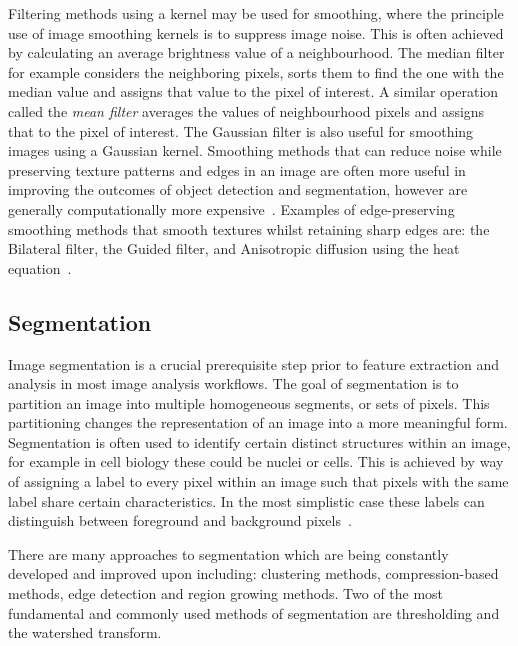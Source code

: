 Filtering methods using a kernel  may be used for smoothing, where the principle use of image smoothing kernels is to suppress image noise. This is often achieved by calculating an average brightness value of a neighbourhood. The median filter for example considers the neighboring pixels, sorts them to find the one with the median value and assigns that value to the pixel of interest. A similar operation called the \emph{mean filter} averages the values of neighbourhood pixels and assigns that to the pixel of interest. The Gaussian filter is also useful for smoothing images using a Gaussian kernel. Smoothing methods that can reduce noise while preserving texture patterns and edges in an image are often more useful in improving the outcomes of object detection and segmentation, however are generally computationally more expensive~\cite{Sonka2007}. Examples of edge-preserving smoothing methods that smooth textures whilst retaining sharp edges are: the Bilateral filter, the Guided filter, and Anisotropic diffusion using the heat equation~\cite{Pal2015}.

\subsection{Segmentation}
\label{introduction:image_processing:segmentation}
Image segmentation is a crucial prerequisite step prior to feature extraction and analysis in most image analysis workflows. The goal of segmentation is to partition an image into multiple homogeneous segments, or sets of pixels. This partitioning changes the representation of an image into a more meaningful form. Segmentation is often used to identify certain distinct structures within an image, for example in cell biology these could be nuclei or cells. This is achieved by way of assigning a label to every pixel within an image such that pixels with the same label share certain characteristics. In the most simplistic case these labels can distinguish between foreground and background pixels~\cite{Russ2006}.

There are many approaches to segmentation which are being constantly developed and improved upon including: clustering methods, compression-based methods, edge detection and region growing methods. Two of the most fundamental and commonly used methods of segmentation are thresholding and the watershed transform.

